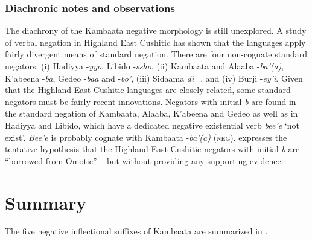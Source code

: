 \documentclass[output=paper,colorlinks,citecolor=brown,draftmode
]{langscibook}
\begin{document}
\subsubsection{Diachronic notes and observations}\label{sec:treis:4.6.4}

The diachrony of the Kambaata negative morphology is still unexplored. A study of verbal negation in Highland East Cushitic \citep{Treis2012b} has shown that the languages apply fairly divergent means of standard negation. There are four non-cognate standard negators: (i) Hadiyya -\textit{yyo}, Libido -\textit{ssho}, (ii) Kambaata and Alaaba -\textit{ba’(a)}, K’abeena -\textit{ba}, Gedeo -\textit{baa} and -\textit{bo’}, (iii) Sidaama \textit{di}=, and (iv) Burji -\textit{ey’i}. Given that the Highland East Cushitic languages are closely related, some standard negators must be fairly recent innovations. Negators with initial \textit{b} are found in the standard negation of Kambaata, Alaaba, K’abeena and Gedeo as well as in Hadiyya and Libido, which have a dedicated negative existential verb \textit{bee’e} ‘not exist’. \textit{Bee’e} is probably cognate with Kambaata  -\textit{ba’(a)} (\textsc{neg}). \citet[22]{Sasse1982} expresses the tentative hypothesis that the Highland East Cushitic negators with initial \textit{b} are “borrowed from Omotic” – but without providing any supporting evidence.

\section{Summary}\label{sec:treis:5}
The five negative inflectional suffixes of Kambaata are summarized in .
\end{document}
